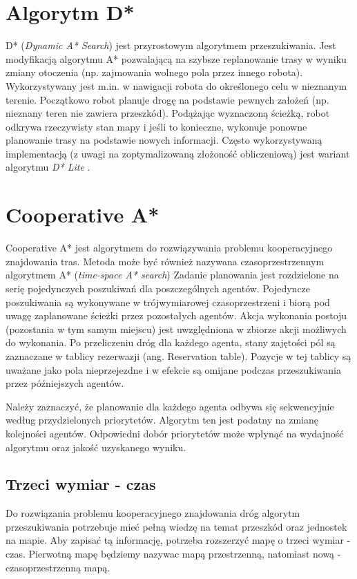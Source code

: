\section{Algorytm D*}
\label{ch:dstar}
D* ({\it Dynamic A* Search}) jest przyrostowym algorytmem przeszukiwania. Jest modyfikacją algorytmu A* pozwalającą na szybsze replanowanie trasy w wyniku zmiany otoczenia (np. zajmowania wolnego pola przez innego robota). Wykorzystywany jest m.in. w nawigacji robota do określonego celu w nieznanym terenie. Początkowo robot planuje drogę na podstawie pewnych założeń (np. nieznany teren nie zawiera przeszkód). Podążając wyznaczoną ścieżką, robot odkrywa rzeczywisty stan mapy i jeśli to konieczne, wykonuje ponowne planowanie trasy na podstawie nowych informacji.
Często wykorzystywaną implementacją (z uwagi na zoptymalizowaną złożoność obliczeniową) jest wariant algorytmu {\it D* Lite} \cite{dstarlite}.

\section{Cooperative A*}
Cooperative A* jest algorytmem do rozwiązywania problemu kooperacyjnego znajdowania tras.
Metoda może być również nazywana czasoprzestrzennym algorytmem A* ({\it time-space A* search})
Zadanie planowania jest rozdzielone na serię pojedynczych poszukiwań dla poszczególnych agentów.
Pojedyncze poszukiwania są wykonywane w trójwymiarowej czasoprzestrzeni i biorą pod uwagę zaplanowane ścieżki przez pozostałych agentów.
Akcja wykonania postoju (pozostania w tym samym miejscu) jest uwzględniona w zbiorze akcji możliwych do wykonania.
Po przeliczeniu dróg dla każdego agenta, stany zajętości pól są zaznaczane w tablicy rezerwazji (ang. Reservation table).
Pozycje w tej tablicy są uważane jako pola nieprzejezdne i w efekcie są omijane podczas przeszukiwania przez późniejszych agentów. \cite{cooppath}

Należy zaznaczyć, że planowanie dla każdego agenta odbywa się sekwencyjnie według przydzielonych priorytetów.
Algorytm ten jest podatny na zmianę kolejności agentów. Odpowiedni dobór priorytetów może wpłynąć na wydajność algorytmu oraz jakość uzyskanego wyniku.

\subsection{Trzeci wymiar - czas}
Do rozwiązania problemu kooperacyjnego znajdowania dróg algorytm przeszukiwania potrzebuje mieć pełną wiedzę na temat przeszkód oraz jednostek na mapie.
Aby zapisać tą informację, potrzeba rozszerzyć mapę o trzeci wymiar - czas. 
Pierwotną mapę będziemy nazywac mapą przestrzenną, natomiast nową - czasoprzestrzenną mapą. \cite{cooppath}

